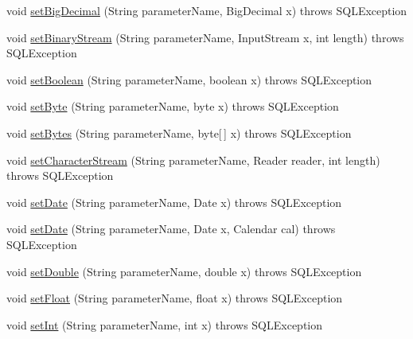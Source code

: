 \begin{DoxyCompactItemize}
\item 
void \mbox{\hyperlink{classcom_1_1mysql_1_1jdbc_1_1_callable_statement_a0750a163eddbe81b5cd66567669e32ac}{set\+Big\+Decimal}} (String parameter\+Name, Big\+Decimal x)  throws S\+Q\+L\+Exception 
\item 
void \mbox{\hyperlink{classcom_1_1mysql_1_1jdbc_1_1_callable_statement_aa088adfccacda0a8bc6982eb059471c2}{set\+Binary\+Stream}} (String parameter\+Name, Input\+Stream x, int length)  throws S\+Q\+L\+Exception 
\item 
void \mbox{\hyperlink{classcom_1_1mysql_1_1jdbc_1_1_callable_statement_a66c023a50fac7d7caadc0b4d0c60e5aa}{set\+Boolean}} (String parameter\+Name, boolean x)  throws S\+Q\+L\+Exception 
\item 
void \mbox{\hyperlink{classcom_1_1mysql_1_1jdbc_1_1_callable_statement_af8225522ac95ef2dd99593ada6618c4c}{set\+Byte}} (String parameter\+Name, byte x)  throws S\+Q\+L\+Exception 
\item 
void \mbox{\hyperlink{classcom_1_1mysql_1_1jdbc_1_1_callable_statement_a8d7f8ce9e36f85ea08530f4261b59146}{set\+Bytes}} (String parameter\+Name, byte\mbox{[}$\,$\mbox{]} x)  throws S\+Q\+L\+Exception 
\item 
void \mbox{\hyperlink{classcom_1_1mysql_1_1jdbc_1_1_callable_statement_a0ce6d88c96d066a7010497f493e1c8a6}{set\+Character\+Stream}} (String parameter\+Name, Reader reader, int length)  throws S\+Q\+L\+Exception 
\item 
void \mbox{\hyperlink{classcom_1_1mysql_1_1jdbc_1_1_callable_statement_a9b7fdf2a24d93e82360a75ec55f799f6}{set\+Date}} (String parameter\+Name, Date x)  throws S\+Q\+L\+Exception 
\item 
void \mbox{\hyperlink{classcom_1_1mysql_1_1jdbc_1_1_callable_statement_a18837a9d186c198eebc30d04fa684679}{set\+Date}} (String parameter\+Name, Date x, Calendar cal)  throws S\+Q\+L\+Exception 
\item 
void \mbox{\hyperlink{classcom_1_1mysql_1_1jdbc_1_1_callable_statement_a44970f6ec5b18becfcedeaae3160a079}{set\+Double}} (String parameter\+Name, double x)  throws S\+Q\+L\+Exception 
\item 
void \mbox{\hyperlink{classcom_1_1mysql_1_1jdbc_1_1_callable_statement_afa45648b124eb9be9e9ff9442e37c090}{set\+Float}} (String parameter\+Name, float x)  throws S\+Q\+L\+Exception 
\item 
void \mbox{\hyperlink{classcom_1_1mysql_1_1jdbc_1_1_callable_statement_abb91064a17230c178eed6e06cbe9981b}{set\+Int}} (String parameter\+Name, int x)  throws S\+Q\+L\+Exception 

\end{DoxyCompactItemize}
